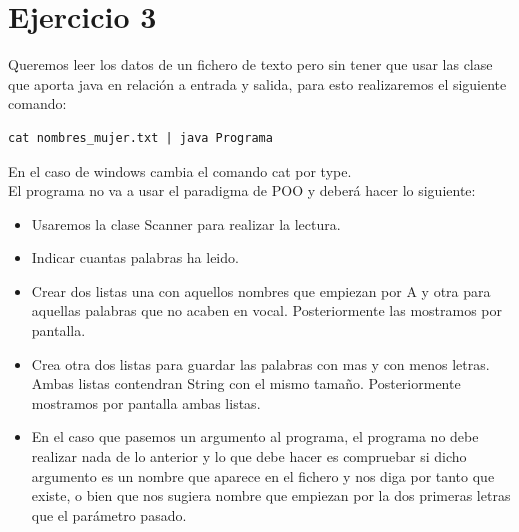\documentclass[4paper]{article}
\begin{document}
\section*{Ejercicio 3}
Queremos leer los datos de un fichero de texto pero sin tener que usar las clase que aporta java en relación a entrada y salida, para esto realizaremos el siguiente comando:
\begin{verbatim}
cat nombres_mujer.txt | java Programa
\end{verbatim}
En el caso de windows cambia el comando cat por type.\\
El programa no va a usar el paradigma de POO y deberá hacer lo siguiente:
\begin{itemize}
\item Usaremos la clase Scanner para realizar la lectura.
\item Indicar cuantas palabras ha leido.
\item Crear dos listas una con aquellos nombres que empiezan por A y otra para aquellas palabras que no acaben en vocal. Posteriormente las mostramos por pantalla.
\item Crea otra dos listas para guardar las palabras con mas y con menos letras. Ambas listas contendran String con el mismo tamaño. Posteriormente mostramos por pantalla ambas listas.
\item En el caso que pasemos un argumento al programa, el programa no debe realizar nada de lo anterior y lo que debe hacer es compruebar si dicho argumento es un nombre que aparece en el fichero y nos diga por tanto que existe, o bien que nos sugiera nombre que empiezan por la dos primeras letras que el parámetro pasado.
\end{itemize}
\newpage
\end{document}
